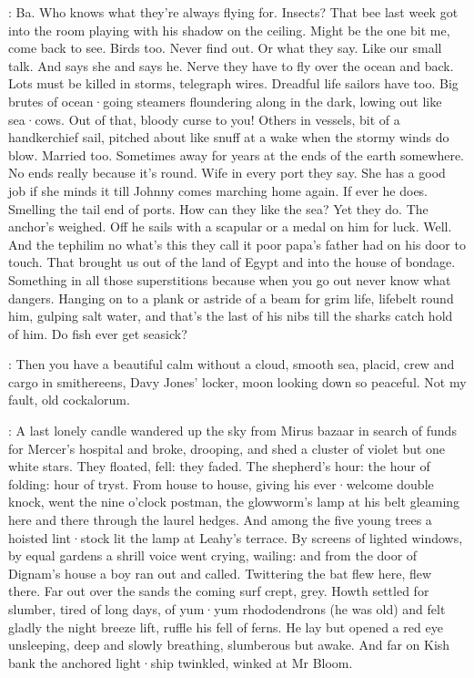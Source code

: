 \Bloom:
Ba.
Who knows what they're always flying for.
Insects?
That bee last week
got into the room playing with his shadow on the ceiling.
Might be the
one bit me,
come back to see.
Birds too.
Never find out.
Or what they say.
Like our small talk.
And says she and says he.
Nerve they have to fly over
the ocean and back.
Lots must be killed in storms,
telegraph wires.
Dreadful life sailors have too.
Big brutes of ocean·going steamers
floundering along in the dark,
lowing out like sea·cows.
Out of that,
bloody curse to you!
Others in vessels,
bit of a handkerchief
sail,
pitched about like snuff at a wake when the stormy winds do blow.
Married too.
Sometimes away for years at the ends of the earth somewhere.
No ends really because it's round.
Wife in every port they say.
She has a
good job if she minds it till Johnny comes marching home again.
If ever he
does.
Smelling the tail end of ports.
How can they like the sea?
Yet they
do.
The anchor's weighed.
Off he sails with a scapular or a medal
on him for luck.
Well.
And the tephilim no what's this they call it poor
papa's father had on his door to touch.
That brought us out of the land
of Egypt and into the house of bondage.
Something in all those
superstitions because when you go out never know what dangers.
Hanging on to a plank or astride of a beam for grim life,
lifebelt round him,
gulping salt water,
and that's the last of his nibs till the sharks
catch hold of him.
Do fish ever get seasick?

\Bloom:
Then you have a beautiful calm without a cloud,
smooth sea,
placid,
crew and cargo in smithereens,
Davy Jones' locker,
moon looking down so
peaceful.
Not my fault,
old cockalorum.

:
A last lonely candle wandered up the sky from Mirus bazaar in search
of funds for Mercer's hospital and broke,
drooping,
and shed a cluster of
violet but one white stars.
They floated,
fell:
they faded.
The shepherd's
hour:
the hour of folding:
hour of tryst.
From house to house,
giving his
ever·welcome double knock,
went the nine o'clock postman,
the glowworm's lamp at his belt gleaming here and there through the laurel
hedges.
And among the five young trees a hoisted lint·stock lit the lamp at
Leahy's terrace.
By screens of lighted windows,
by equal gardens a shrill
voice went crying,
wailing:
and from the door of Dignam's house a boy ran out
and called.
Twittering the bat flew here,
flew there.
Far out over the
sands the coming surf crept,
grey.
Howth settled for slumber,
tired of
long days,
of yum·yum rhododendrons (he was old) and felt gladly the night
breeze lift,
ruffle his fell of ferns.
He lay but opened a red eye
unsleeping,
deep and slowly breathing,
slumberous but awake.
And far on
Kish bank the anchored light·ship twinkled,
winked at Mr Bloom.

